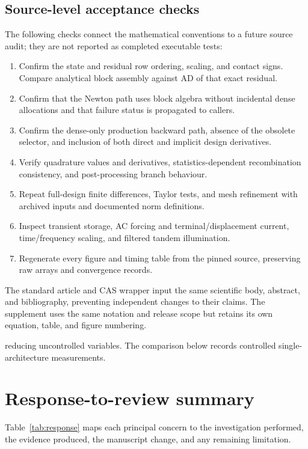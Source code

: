\documentclass[11pt,a4paper]{article}
\numberwithin{equation}{section}
\begin{document}
\subsection{Source-level acceptance checks}
The following checks connect the mathematical conventions to a future
source audit; they are not reported as completed executable tests:
\begin{enumerate}
\item Confirm the state and residual row ordering, scaling, and contact
signs. Compare analytical block assembly against AD of that exact residual.
\item Confirm that the Newton path uses block algebra without incidental
dense allocations and that failure status is propagated to callers.
\item Confirm the dense-only production backward path, absence of the
obsolete  selector, and inclusion of both direct and
implicit design derivatives.
\item Verify quadrature values and derivatives, statistics-dependent
recombination consistency, and post-processing branch behaviour.
\item Repeat full-design finite differences, Taylor tests, and mesh
refinement with archived inputs and documented norm definitions.
\item Inspect transient storage, AC forcing and terminal/displacement
current, time/frequency scaling, and filtered tandem illumination.
\item Regenerate every figure and timing table from the pinned source,
preserving raw arrays and convergence records.
\end{enumerate}
The standard article and CAS wrapper input the same scientific body,
abstract, and bibliography, preventing independent changes to their
claims. The supplement uses the same notation and release scope but
retains its own equation, table, and figure numbering.

reducing uncontrolled variables. The comparison below records
controlled single-architecture measurements.

\section{Response-to-review summary}\label{supp:response}
Table~\ref{tab:response} maps each principal concern to the
investigation performed, the evidence produced, the manuscript change,
and any remaining limitation.
\end{document}
